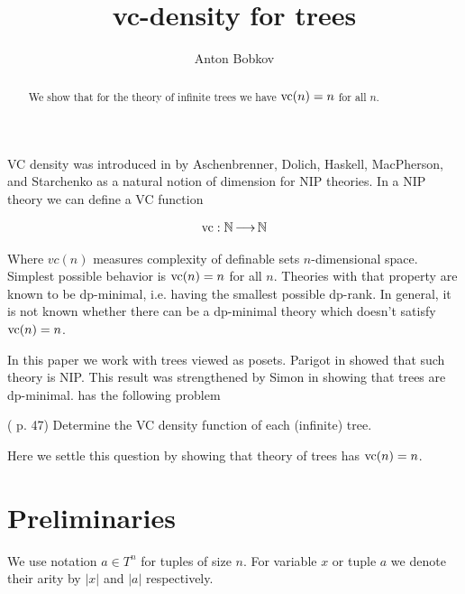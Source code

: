 \documentclass{amsart}
\begin{document}
\title{vc-density for trees}
\author{Anton Bobkov}

\begin{abstract}
	We show that for the theory of infinite trees we have $\operatorname{vc}(n) = n$ for all $n$.
\end{abstract}

\maketitle

VC density was introduced in \cite{vc_density} by Aschenbrenner, Dolich, Haskell, MacPherson, and Starchenko as a natural notion of dimension for NIP theories. In a NIP theory we can define a VC function

\begin{align*}
	\operatorname{vc} : \mathbb{N} \operatorname{\longrightarrow} \mathbb{N}
\end{align*}

Where $vc(n)$ measures complexity of definable sets $n$-dimensional space. Simplest possible behavior is $\operatorname{vc}(n) = n$ for all $n$. Theories with that property are known to be dp-minimal, i.e. having the smallest possible dp-rank. In general, it is not known whether there can be a dp-minimal theory which doesn't satisfy $\operatorname{vc}(n)=n$.

In this paper we work with trees viewed as posets. Parigot in \cite{parigot_trees} showed that such theory is NIP. This result was strengthened by Simon in \cite{simon_dp_min} showing that trees are dp-minimal. \cite{vc_density} has the following problem 

\begin{Problem} (\cite{vc_density} p. 47)
	Determine the VC density function of each (infinite) tree.
\end{Problem}

Here we settle this question by showing that theory of trees has $\operatorname{vc}(n) = n$.

\section{Preliminaries}
We use notation $a \in T^n$ for tuples of size $n$. For variable $x$ or tuple $a$ we denote their arity by $|x|$ and $|a|$ respectively.
\end{document}
